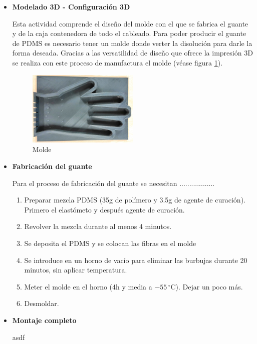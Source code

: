 \begin{itemize}
	\item \textbf{Modelado 3D - Configuración 3D}
	
	Esta actividad comprende el diseño del molde con el que se fabrica el guante y de la caja contenedora de todo el cableado.
	Para poder producir el guante de PDMS es necesario tener un molde donde verter la disolución para darle la forma deseada. Gracias a las versatilidad de diseño que ofrece la impresión 3D se realiza con este proceso de manufactura el molde (véase figura \ref{fig:molde}). 
\begin{figure}[H]
	\centering
	\includegraphics[width=0.5\textwidth]{./img/molde1}
	\caption{Molde} \label{fig:molde}
\end{figure}

	
 
	\item \textbf{Fabricación del guante}
	
	Para el proceso de fabricación del guante se necesitan ..................
	
	\begin{enumerate}
		\item Preparar mezcla PDMS (35g de polímero y 3.5g de agente de curación). Primero el
		elastómeto y después agente de curación.
		\item Revolver la mezcla durante al menos 4 minutos.
		\item Se deposita el PDMS y se colocan las fibras en el molde
		\item Se introduce en un horno de vacío para eliminar las burbujas durante 20 minutos, sin aplicar
		temperatura.
		\item Meter el molde en el horno (4h y media a $-55\,^{\circ}\mathrm{C}$). Dejar un poco más.
		\item Desmoldar.

	\end{enumerate}
	
	
	\item \textbf{Montaje completo}
	
	asdf
	
\end{itemize}

